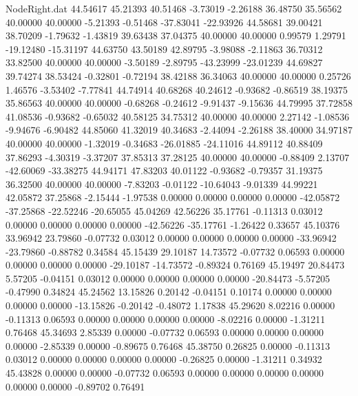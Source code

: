 \begin{filecontents}{NodeRight.dat}
  44.54617   45.21393   40.51468    -3.73019   -2.26188   36.48750   35.56562   40.00000   40.00000   -5.21393   -0.51468  -37.83041  -22.93926
  44.58681   39.00421   38.70209    -1.79632   -1.43819   39.63438   37.04375   40.00000   40.00000    0.99579    1.29791  -19.12480  -15.31197
  44.63750   43.50189   42.89795    -3.98088   -2.11863   36.70312   33.82500   40.00000   40.00000   -3.50189   -2.89795  -43.23999  -23.01239
  44.69827   39.74274   38.53424    -0.32801   -0.72194   38.42188   36.34063   40.00000   40.00000    0.25726    1.46576   -3.53402   -7.77841
  44.74914   40.68268   40.24612    -0.93682   -0.86519   38.19375   35.86563   40.00000   40.00000   -0.68268   -0.24612   -9.91437   -9.15636
  44.79995   37.72858   41.08536    -0.93682   -0.65032   40.58125   34.75312   40.00000   40.00000    2.27142   -1.08536   -9.94676   -6.90482
  44.85060   41.32019   40.34683    -2.44094   -2.26188   38.40000   34.97187   40.00000   40.00000   -1.32019   -0.34683  -26.01885  -24.11016
  44.89112   40.88409   37.86293    -4.30319   -3.37207   37.85313   37.28125   40.00000   40.00000   -0.88409    2.13707  -42.60069  -33.38275
  44.94171   47.83203   40.01122    -0.93682   -0.79357   31.19375   36.32500   40.00000   40.00000   -7.83203   -0.01122  -10.64043   -9.01339
  44.99221   42.05872   37.25868    -2.15444   -1.97538    0.00000    0.00000    0.00000    0.00000  -42.05872  -37.25868  -22.52246  -20.65055
  45.04269   42.56226   35.17761    -0.11313    0.03012    0.00000    0.00000    0.00000    0.00000  -42.56226  -35.17761   -1.26422    0.33657
  45.10376   33.96942   23.79860    -0.07732    0.03012    0.00000    0.00000    0.00000    0.00000  -33.96942  -23.79860   -0.88782    0.34584
  45.15439   29.10187   14.73572    -0.07732    0.06593    0.00000    0.00000    0.00000    0.00000  -29.10187  -14.73572   -0.89324    0.76169
  45.19497   20.84473    5.57205    -0.04151    0.03012    0.00000    0.00000    0.00000    0.00000  -20.84473   -5.57205   -0.47990    0.34824
  45.24562   13.15826    0.20142    -0.04151    0.10174    0.00000    0.00000    0.00000    0.00000  -13.15826   -0.20142   -0.48072    1.17838
  45.29620    8.02216    0.00000    -0.11313    0.06593    0.00000    0.00000    0.00000    0.00000   -8.02216    0.00000   -1.31211    0.76468
  45.34693    2.85339    0.00000    -0.07732    0.06593    0.00000    0.00000    0.00000    0.00000   -2.85339    0.00000   -0.89675    0.76468
  45.38750    0.26825    0.00000    -0.11313    0.03012    0.00000    0.00000    0.00000    0.00000   -0.26825    0.00000   -1.31211    0.34932
  45.43828    0.00000    0.00000    -0.07732    0.06593    0.00000    0.00000    0.00000    0.00000    0.00000    0.00000   -0.89702    0.76491

\end{filecontents}

